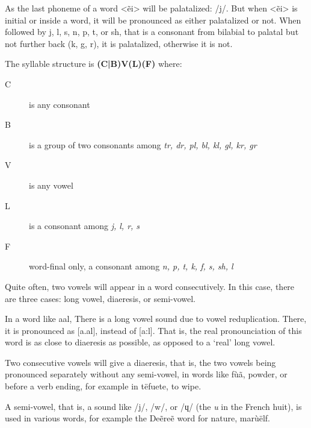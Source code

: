 As the last phoneme of a word <ẽi> will be palatalized: /{\ipaET}j/. But when <ẽi> is initial or inside a word, it will be pronounced as either palatalized or not. When followed by j, l, s, n, p, t, or sh, that is a consonant from bilabial to palatal but not further back (k, g, r), it is palatalized, otherwise it is not.

The syllable structure is \textbf{(C|B)V(L)(F)} where:
\begin{description}
\item[C] is any consonant
\item[B] is a group of two consonants among \emph{tr, dr, pl, bl, kl, gl, kr, gr}
\item[V] is any vowel
\item[L] is a consonant among \emph{j, l, r, s}
\item[F] word-final only, a consonant among \emph{n, p, t, k, f, s, sh, l}
\end{description}

Quite often, two vowels will appear in a word consecutively. In this case, there are three cases: long vowel, diaeresis, or semi-vowel.

In a word like \gls{aal}, There is a long vowel sound due to vowel reduplication. There, it is pronounced as [a.al], instead of [a:l]. That is, the real pronounciation of this word is as close to diaeresis as possible, as opposed to a ‘real’ long vowel.

Two consecutive vowels will give a diaeresis, that is, the two vowels being pronounced separately without any semi-vowel, in words like \gls{fùã}, powder, or before a verb ending, for example in \gls{tëfuete}, to wipe.

A semi-vowel, that is, a sound like /j/, /w/, or /ɥ/ (the \emph{u} in the French huit), is used in various words, for example the Deẽreẽ word for nature, \gls{marùëlf}.

